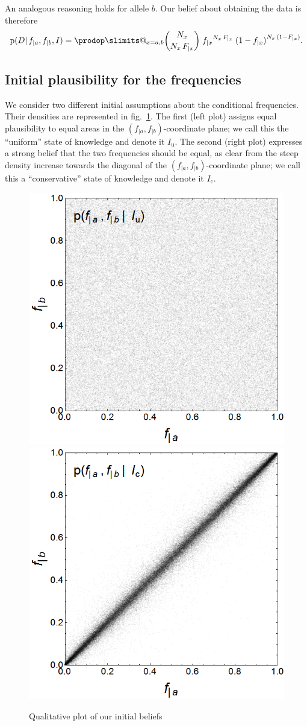 \documentclass[\ifafour a4paper,12pt,\else a5paper,10pt,\fi%
onecolumn,oneside,article,%
british%
]{memoir}
\makeatletter
\theoremstyle{remark}
\theoremstyle{innote}
\def\prod{\DOTSI\prodop\slimits@}
\newcommand*{\pf}{\mathrm{p}}%
\renewcommand*{\|}{\mathpunct{|}}
\newcommand*{\fig}{fig.}%
\newcommand*{\yD}{D}
\newcommand*{\yI}{I}
\newcommand*{\yIu}{\yI_\text{u}}
\newcommand*{\yIc}{\yI_\text{c}}
\newcommand*{\ya}{a}
\newcommand*{\yb}{b}
\makeatother
\begin{document}
An analogous reasoning holds for allele $\yb$. Our belief about obtaining
the data is therefore
\begin{equation}
  \label{eq:sampling_belief_combined}
  \pf(\yD \|  f_{|\ya},f_{|\yb}, \yI)
  =
 \prod_{x=\ya,\yb} \binom{N_{x}}{N_{x}\,F_{|x}}\;{f_{|x}}^{N_{x}\,F_{|x}} \;
  {(1-f_{|x})}^{N_{x}\,(1-F_{|x})}.
\end{equation}


\subsection{Initial plausibility for the frequencies}
\label{sec:p_initial}

We consider two different initial assumptions about the conditional
frequencies. Their densities are represented in
\fig~\ref{fig:initial_beliefs}. The first (left plot) assigns equal
plausibility to equal areas in the $(f_{|\ya},f_{|\yb})$-coordinate plane;
we call this the \enquote{uniform} state of knowledge and denote it $\yIu$.
The second (right plot) expresses a strong belief that the two frequencies
should be equal, as clear from the steep density increase towards the diagonal of
the $(f_{|\ya},f_{|\yb})$-coordinate plane; we call this a
\enquote{conservative} state of knowledge and denote it $\yIc$.
\begin{figure}[b!]%
 \centering\includegraphics[width=0.49\linewidth]{unif_prior_list.png}%
\includegraphics[width=0.49\linewidth]{conserv_prior_list.png}
\caption{Qualitative plot of our initial beliefs}\label{fig:initial_beliefs}
\end{figure}%
\end{document}

